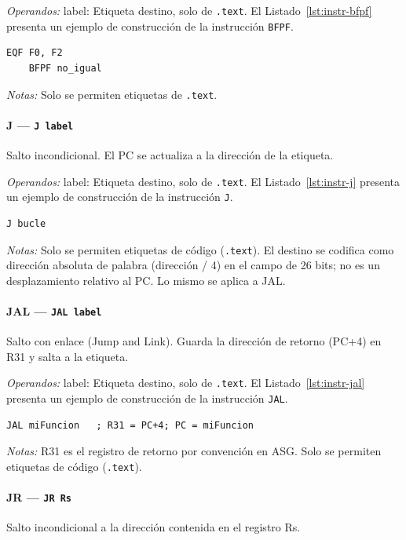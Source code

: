 \documentclass[../main.tex]{subfiles}
\begin{document}
\textit{Operandos:} label: Etiqueta destino, solo de \texttt{.text}.
El Listado~\ref{lst:instr-bfpf} presenta un ejemplo de construcción de la instrucción \texttt{BFPF}.

\begin{lstlisting}[caption={BFPF},label={lst:instr-bfpf}]
	EQF F0, F2
	BFPF no_igual
\end{lstlisting}
\textit{Notas:} Solo se permiten etiquetas de \texttt{.text}.

\paragraph*{J --- \texttt{J label}}
Salto incondicional. El PC se actualiza a la dirección de la etiqueta.

\textit{Operandos:} label: Etiqueta destino, solo de \texttt{.text}.
El Listado~\ref{lst:instr-j} presenta un ejemplo de construcción de la instrucción \texttt{J}.

\begin{lstlisting}[caption={J},label={lst:instr-j}]
	J bucle
\end{lstlisting}
\textit{Notas:} Solo se permiten etiquetas de código (\texttt{.text}). El destino se codifica como dirección absoluta de palabra (dirección / 4) en el campo de 26 bits; no es un desplazamiento relativo al PC. Lo mismo se aplica a JAL.

\paragraph*{JAL --- \texttt{JAL label}}
Salto con enlace (Jump and Link). Guarda la dirección de retorno (PC+4) en R31 y salta a la etiqueta.

\textit{Operandos:} label: Etiqueta destino, solo de \texttt{.text}.
El Listado~\ref{lst:instr-jal} presenta un ejemplo de construcción de la instrucción \texttt{JAL}.

\begin{lstlisting}[caption={JAL},label={lst:instr-jal}]
	JAL miFuncion   ; R31 = PC+4; PC = miFuncion
\end{lstlisting}
\textit{Notas:} R31 es el registro de retorno por convención en ASG. Solo se permiten etiquetas de código (\texttt{.text}).

\paragraph*{JR --- \texttt{JR Rs}}
Salto incondicional a la dirección contenida en el registro Rs.
\end{document}
